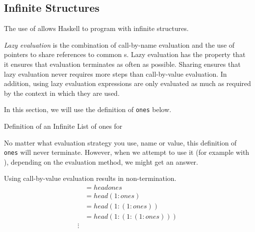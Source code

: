 \subsection{Infinite Structures}\label{subsec:Infinite_Structures}
The use of  allows Haskell to program with infinite structures.

\begin{definition}\label{def:Lazy_Evaluation}
  \emph{Lazy evaluation} is the combination of call-by-name evaluation and the use of pointers to share references to common s.
  Lazy evaluation has the property that it ensures that evaluation terminates as often as possible.
  Sharing ensures that lazy evaluation never requires more steps than call-by-value evaluation.
  In addition, using lazy evaluation expressions are only evaluated as much as required by the context in which they are used.
\end{definition}

In this section, we will use the definition of \texttt{ones} below.
\begin{listing}[h!tbp]
\caption{Definition of an Infinite List of ones for }
\label{lst:Ones_Definition}
\end{listing}

No matter what evaluation strategy you use, name or value, this definition of \texttt{ones} will never terminate.
However, when we attempt to use it (for example with ), depending on the evaluation method, we might get an answer.

Using call-by-value evaluation results in non-termination.
\begin{align*}
  &= head ones \\
  &= head (1 : ones) \\
  &= head (1 : (1 : ones)) \\
  &= head (1 : (1 : (1 : ones))) \\
  \vdots
\end{align*}


